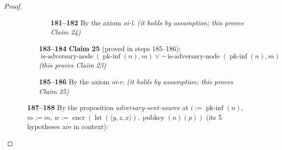\documentclass[11pt]{article}
\theoremstyle{plain}
\begin{document}
\begin{proof}
\begin{itemize}[leftmargin=2.8em, itemsep=4pt, parsep=1pt]
\begin{itemize}[leftmargin=2.8em, itemsep=4pt, parsep=1pt]
\begin{itemize}[leftmargin=2.8em, itemsep=4pt, parsep=1pt]
  \begin{itemize}[leftmargin=2.8em, itemsep=4pt, parsep=1pt]
  \item[\textbf{181--182}] By the axiom \emph{oi-l}.  \emph{(it holds by assumption; this proves Claim 24)}
  \end{itemize}
  \item[\textbf{183--184}] \textbf{Claim 25} (proved in steps 185--186):
\begin{equation*}
\operatorname{is\text{-}adversary\text{-}node}(\operatorname{pk\text{-}inf}(n), m) \vee \neg \operatorname{is\text{-}adversary\text{-}node}(\operatorname{pk\text{-}inf}(n), m)
\end{equation*}
  \emph{(this proves Claim 23)}
  \end{itemize}
  \begin{itemize}[leftmargin=2.8em, itemsep=4pt, parsep=1pt]
  \item[\textbf{185--186}] By the axiom \emph{oi-r}.  \emph{(it holds by assumption; this proves Claim 25)}
  \end{itemize}
  \item[\textbf{187--188}] By the proposition \emph{adversary-sent-source} at $i := \operatorname{pk\text{-}inf}(n)$, $m := m$, $w := \operatorname{encr}(\operatorname{lst}(\langle y, z, x \rangle), \operatorname{pubkey}(n)(p))$ (its 5 hypotheses are in context):
\begin{equation*}

\end{equation*}
\end{itemize}
\end{itemize}
\end{proof}
\end{document}
